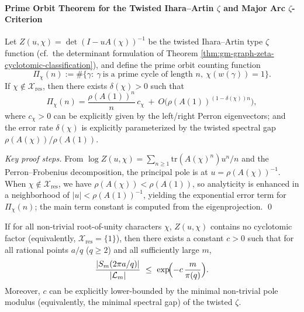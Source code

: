 \paragraph{Prime Orbit Theorem for the Twisted Ihara--Artin \texorpdfstring{$\zeta$}{zeta} and Major Arc \texorpdfstring{$\zeta$}{zeta}-Criterion}
\begin{theorem}\label{thm:gm-twisted-zeta-prime-orbit}
Let \(Z(u,\chi)=\det(I-uA(\chi))^{-1}\) be the twisted Ihara--Artin type \(\zeta\) function (cf.\ the determinant formulation of Theorem \ref{thm:gm-graph-zeta-cyclotomic-classification}), and define the prime orbit counting function
\[
\Pi_\chi(n):=\#\{\gamma:\ \gamma\ \text{is a prime cycle of length }n,\ \chi(w(\gamma))=1\}.
\]
If \(\chi\notin\mathcal{X}_{\mathrm{res}}\), then there exists \(\delta(\chi)>0\) such that
\[
\Pi_\chi(n)
=\frac{\rho(A(1))^n}{n}\,c_\chi\ +\ O\!\bigl(\rho(A(1))^{(1-\delta(\chi))n}\bigr),
\]
where \(c_\chi>0\) can be explicitly given by the left/right Perron eigenvectors; and the error rate \(\delta(\chi)\) is explicitly parameterized by the twisted spectral gap \(\rho(A(\chi))/\rho(A(1))\).
\end{theorem}

\begin{proof}[Key proof steps]
From \(\log Z(u,\chi)=\sum_{n\ge 1}\mathrm{tr}(A(\chi)^n)u^n/n\) and the Perron--Frobenius decomposition, the principal pole is at \(u=\rho(A(\chi))^{-1}\).
When \(\chi\notin\mathcal{X}_{\mathrm{res}}\), we have \(\rho(A(\chi))<\rho(A(1))\), so analyticity is enhanced in a neighborhood of \(|u|<\rho(A(1))^{-1}\), yielding the exponential error term for \(\Pi_\chi(n)\); the main term constant is computed from the eigenprojection. \qed
\end{proof}

\begin{proposition}[Major Arc Spectral Suppression via the \texorpdfstring{$\zeta$}{zeta}-Criterion: No Cyclotomic Factor \texorpdfstring{$\Rightarrow$}{=>} Uniform Major Arc Decay]\label{prop:gm-zeta-criterion-major-arc}
If for all non-trivial root-of-unity characters \(\chi\), \(Z(u,\chi)\) contains no cyclotomic factor (equivalently, \(\mathcal{X}_{\mathrm{res}}=\{1\}\)), then there exists a constant \(c>0\) such that for all rational points \(a/q\) (\(q\ge 2\)) and all sufficiently large \(m\),
\[
\frac{|S_m(2\pi a/q)|}{|\mathcal{L}_m|}\ \le\ \exp\!\Bigl(-c\,\frac{m}{\pi(q)}\Bigr).
\]
Moreover, \(c\) can be explicitly lower-bounded by the minimal non-trivial pole modulus (equivalently, the minimal spectral gap) of the twisted \(\zeta\).
\end{proposition}

